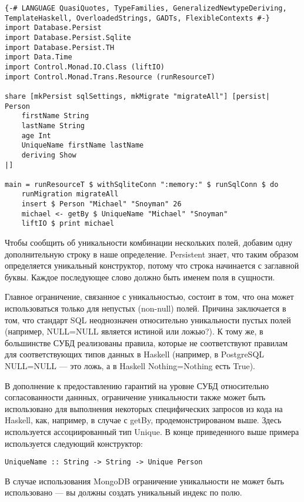 \begin{lstlisting}
{-# LANGUAGE QuasiQuotes, TypeFamilies, GeneralizedNewtypeDeriving, TemplateHaskell, OverloadedStrings, GADTs, FlexibleContexts #-}
import Database.Persist
import Database.Persist.Sqlite
import Database.Persist.TH
import Data.Time
import Control.Monad.IO.Class (liftIO)
import Control.Monad.Trans.Resource (runResourceT)

share [mkPersist sqlSettings, mkMigrate "migrateAll"] [persist|
Person
    firstName String
    lastName String
    age Int
    UniqueName firstName lastName
    deriving Show
|]

main = runResourceT $ withSqliteConn ":memory:" $ runSqlConn $ do
    runMigration migrateAll
    insert $ Person "Michael" "Snoyman" 26
    michael <- getBy $ UniqueName "Michael" "Snoyman"
    liftIO $ print michael
\end{lstlisting}%

Чтобы сообщить об уникальности комбинации нескольких полей, добавим одну дополнительную строку в наше определение. Persistent знает, что таким образом определяется уникальный конструктор, потому что строка начинается с заглавной буквы. Каждое последующее слово должно быть именем поля в сущности.

Главное ограничение, связанное с уникальностью, состоит в том, что она может использоваться только для непустых (non-null) полей. Причина заключается в том, что стандарт SQL неоднозначен относительно уникальности пустых полей (например, NULL=NULL является истиной или ложью?). К тому же, в большинстве СУБД реализованы правила, которые не соответствуют правилам для соответствующих типов данных в Haskell (например, в PostgreSQL NULL=NULL --- это ложь, а в Haskell Nothing=Nothing есть True).

В дополнение к предоставлению гарантий на уровне СУБД относительно согласованности даннных, ограничение уникальности также может быть использовано для выполнения некоторых специфических запросов из кода на Haskell, как, например, в случае с getBy, продемонстрированом выше. Здесь используется ассоциированный тип Unique. В конце приведенного выше примера используется следующий конструктор:

\begin{lstlisting}
UniqueName :: String -> String -> Unique Person
\end{lstlisting}

\begin{remark}
В случае использования MongoDB ограничение уникальности не может быть использовано --- вы должны создать уникальный индекс по полю.
\end{remark}

